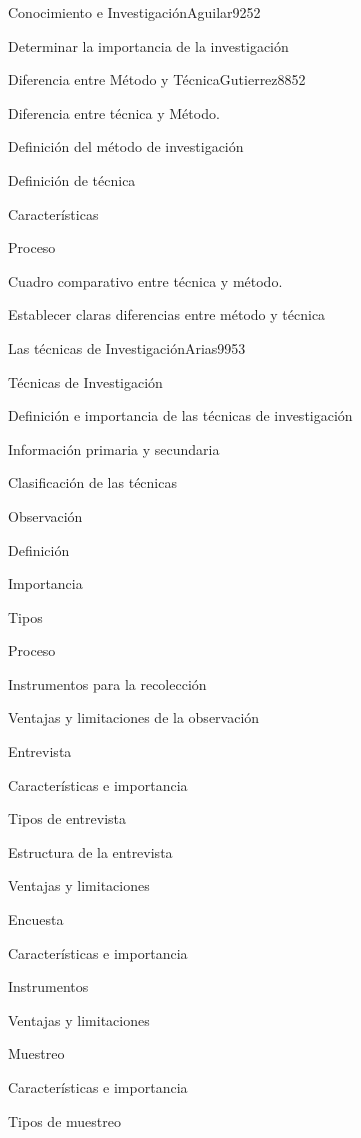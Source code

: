 \begin{syllabus}
\begin{unit}{Conocimiento e Investigación}{Aguilar92}{5}{2}
   \begin{learningoutcomes}
      \item Determinar la importancia de la investigación
   \end{learningoutcomes}
\end{unit}

\begin{unit}{Diferencia entre Método y Técnica}{Gutierrez88}{5}{2}
   \begin{topics}
      \item Diferencia entre técnica y Método.
	\item Definición del método de investigación
	\item Definición de técnica
	\item Características
	\item Proceso
	\item Cuadro comparativo entre técnica y método.
   \end{topics}

   \begin{learningoutcomes}
      \item Establecer claras diferencias entre método y técnica
   \end{learningoutcomes}
\end{unit}

\begin{unit}{Las técnicas de Investigación}{Arias99}{5}{3}
   \begin{topics}
      \item Técnicas de Investigación
	\item Definición e importancia de las técnicas de investigación
	\item Información primaria y secundaria
	\item Clasificación de las técnicas
	\item Observación
	\item Definición
	\item Importancia
	\item Tipos
	\item Proceso
	\item Instrumentos para la recolección 
	\item Ventajas y limitaciones de la observación
	\item Entrevista
	\item Características e importancia
	\item Tipos de entrevista
	\item Estructura de la entrevista
	\item Ventajas y limitaciones
	\item Encuesta
	\item Características e importancia
	\item Instrumentos
	\item Ventajas y limitaciones
	\item Muestreo
	\item Características e importancia
	\item Tipos de muestreo
   \end{topics}


\end{unit}
\end{syllabus}
